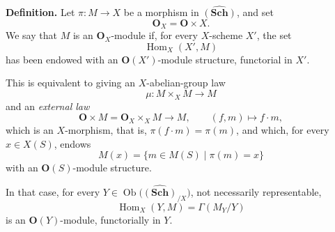 \medskip
\noindent\textbf{Definition.}
Let \(\pi:M\to X\) be a morphism in \(\widehat{(\mathbf{Sch})}\), and set
\[
  \mathbf O_X=\mathbf O\times X.
\]
We say that \(M\) is an \(\mathbf O_X\)-module if, for every \(X\)-scheme
\(X'\), the set
\[
  \operatorname{Hom}_X(X',M)
\]
has been endowed with an \(\mathbf O(X')\)-module structure, functorial in
\(X'\).

This is equivalent to giving an \(X\)-abelian-group law
\[
  \mu:M\times_X M\longrightarrow M
\]
and an \emph{external law}
\[
  \mathbf O\times M
    =\mathbf O_X\times_X M
    \longrightarrow M,
  \qquad
  (f,m)\longmapsto f\cdot m,
\]
which is an \(X\)-morphism, that is,
\(\pi(f\cdot m)=\pi(m)\), and which, for every \(x\in X(S)\), endows
\[
  M(x)=\{m\in M(S)\mid\pi(m)=x\}
\]
with an \(\mathbf O(S)\)-module structure.

In that case, for every
\(Y\in\operatorname{Ob}\bigl(\widehat{(\mathbf{Sch})}_{/X}\bigr)\),
not necessarily representable,
\[
  \operatorname{Hom}_X(Y,M)=\Gamma(M_Y/Y)
\]
is an \(\mathbf O(Y)\)-module, functorially in \(Y\).

